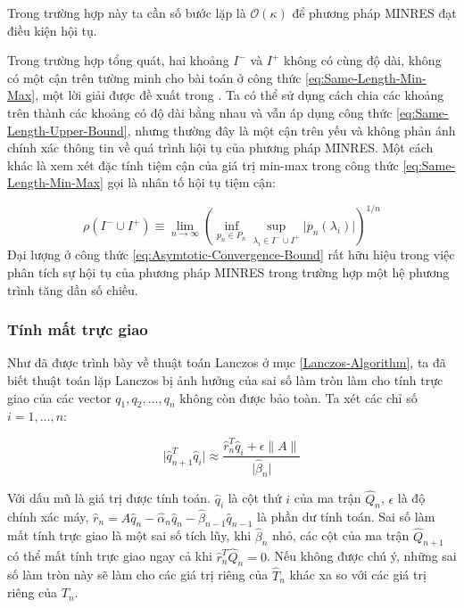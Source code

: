 \documentclass[14pt, a4paper]{article}
\numberwithin{equation}{section}
\numberwithin{algorithm}{section}
\numberwithin{figure}{section}
\numberwithin{dl}{section}
\numberwithin{md}{section}
\numberwithin{bd}{section}
\numberwithin{dn}{section}
\begin{document}
\begin{enumerate}[a)]
\begin{itemize}
        Trong trường hợp này ta cần số bước lặp là $\mathcal{O}(\kappa)$ để phương pháp MINRES đạt điều kiện hội tụ.

        Trong trường hợp tổng quát, hai khoảng $I^-$ và $I^+$ không có cùng độ dài, không có một cận trên tường minh cho bài toán ở công thức \ref{eq:Same-Length-Min-Max}, một lời giải được đề xuất trong \cite{fischer2011polynomial}. Ta có thể sử dụng cách chia các khoảng trên thành các khoảng có độ dài bằng nhau và vẫn áp dụng công thức \ref{eq:Same-Length-Upper-Bound}, nhưng thường đây là một cận trên yếu và không phản ánh chính xác thông tin về quá trình hội tụ của phương pháp MINRES.
        Một cách khác là xem xét đặc tính tiệm cận của giá trị min-max trong công thức \ref{eq:Same-Length-Min-Max} gọi là nhân tố hội tụ tiệm cận:

        \begin{equation} \label{eq:Asymtotic-Convergence-Bound}
            \rho(I^- \cup I^+) \equiv \lim_{n \rightarrow \infty} (\inf_{p_n \in P_n} \sup_{\lambda_i \in I^- \cup I^+} \lvert p_n(\lambda_i) \rvert)^{1/n}
        \end{equation}
        Đại lượng ở công thức \ref{eq:Asymtotic-Convergence-Bound} rất hữu hiệu trong việc phân tích sự hội tụ của phương pháp MINRES trong trường hợp một hệ phương trình tăng dần số chiều.

    \end{itemize}
\end{enumerate}

\subsubsection{Tính mất trực giao}

Như đã được trình bày về thuật toán Lanczos ở mục \ref{Lanczos-Algorithm}, ta đã biết thuật toán lặp Lanczos bị ảnh hưởng của sai số làm tròn làm cho tính trực giao của các vector $q_1, q_2, \dots, q_n$ không còn được bảo toàn. Ta xét các chỉ số $i=1, \dots, n$:

\begin{equation}
    \lvert \hat{q}_{n+1}^T \hat{q}_i \rvert \approx \dfrac{\hat{r}_n^T \hat{q}_i + \epsilon \lVert A \rVert}{\lvert \hat{\beta}_n \rvert}
\end{equation}

Với dấu mũ là giá trị được tính toán. $\hat{q}_i$ là cột thứ $i$ của ma trận $\hat{Q}_n$, $\epsilon$ là độ chính xác máy, $\hat{r}_n=A\hat{q}_n - \hat{\alpha}_n \hat{q}_n - \hat{\beta}_{n-1} \hat{q}_{n-1} $ là phần dư tính toán. Sai số làm mất tính trực giao là một sai số tích lũy, khi $\hat{\beta}_n$ nhỏ, các cột của ma trận $\hat{Q}_{n+1}$ có thể mất tính trực giao ngay cả khi $\hat{r}_n^T \hat{Q}_n=0$. Nếu không được chú ý, những sai số làm tròn này sẽ làm cho các giá trị riêng của $\hat{T}_n$ khác xa so với các giá trị riêng của $T_n$.
\end{document}

